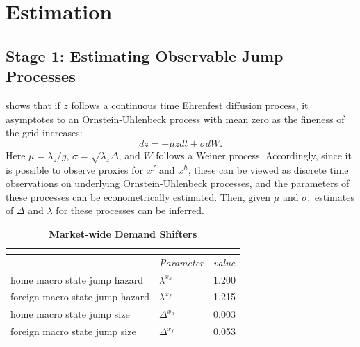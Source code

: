 \section{Estimation}

\subsection{Stage 1: Estimating Observable Jump Processes}

\citet{shimer2005cyclical} shows that if $z$ follows a continuous time Ehrenfest
diffusion process, it asymptotes to an Ornstein-Uhlenbeck process with mean
zero as the fineness of the grid increases:\footnotemark{} 
\begin{equation*}
dz=-\mu zdt+\sigma dW.
\end{equation*}%
Here $\mu =\lambda _{z}/g$, $\sigma =\sqrt{\lambda _{z}}\Delta $, and $W$
follows a Weiner process. Accordingly, since it is possible to observe
proxies for $x^{f}$ and $x^{h}$, these can be viewed as discrete time
observations on underlying Ornstein-Uhlenbeck processes, and the parameters
of these processes can be econometrically estimated. Then, given $\mu $ and $%
\sigma ,$ estimates of $\Delta $ and $\lambda $ for these processes can be
inferred.

\begin{table}
    \centering
    \begin{tabular}{lll}
        \multicolumn{3}{c}{\textbf{}} \\ 
        \hline\hline
        & \textit{Parameter} & \textit{value} \\ \hline
        home macro state jump hazard    & $\lambda ^{x_{h}}$ & \multicolumn{1}{c}{1.200}  \\
        foreign macro state jump hazard & $\lambda ^{x_{f}}$ & \multicolumn{1}{c}{ 1.215} \\
        home macro state jump size      & $\Delta ^{x_{h}}$  & \multicolumn{1}{c}{0.003}  \\
        foreign macro state jump size   & $\Delta ^{x_{f}}$  & \multicolumn{1}{c}{0.053}  \\ \hline
    \end{tabular}%
    \caption{\textbf{Market-wide Demand Shifters}}
    \label{tab:dem_shift}
\end{table}


